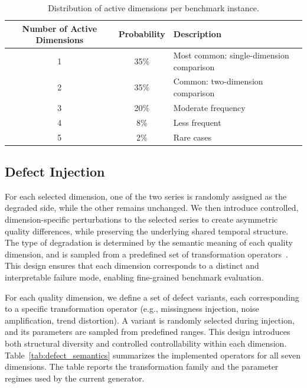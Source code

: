 \documentclass{article}
\begin{document}
\begin{table}[h]
\centering
\caption{Distribution of active dimensions per benchmark instance.}
\small
\setlength{\tabcolsep}{6pt}
\renewcommand{\arraystretch}{1.1}
\begin{tabular}{c c l}
\toprule
\textbf{Number of Active Dimensions} & \textbf{Probability} & \textbf{Description} \\
\midrule
1   & 35\% & Most common: single-dimension comparison \\
2   & 35\% & Common: two-dimension comparison \\
3   & 20\% & Moderate frequency \\
4   & 8\%  & Less frequent \\
5   & 2\%  & Rare cases \\
\bottomrule
\end{tabular}
\label{tab:active_dim_dist}
\end{table}

\subsection{Defect Injection}
\label{app:benchmark_defect_injection}

For each selected dimension, one of the two series is randomly assigned as the degraded side, while the other remains unchanged. We then introduce controlled, dimension-specific perturbations to the selected series to create asymmetric quality differences, while preserving the underlying shared temporal structure.
The type of degradation is determined by the semantic meaning of each quality dimension, and is sampled from a predefined set of transformation operators~\citep{xie2025chatts}. This design ensures that each dimension corresponds to a distinct and interpretable failure mode, enabling fine-grained benchmark evaluation.



For each quality dimension, we define a set of defect variants, each corresponding to a specific transformation operator (e.g., missingness injection, noise amplification, trend distortion). A variant is randomly selected during injection, and its parameters are sampled from predefined ranges. This design introduces both structural diversity and controlled controllability within each dimension.
Table~\ref{tab:defect_semantics} summarizes the implemented operators for all seven dimensions. The table reports the transformation family and the parameter regimes used by the current generator.
\end{document}
